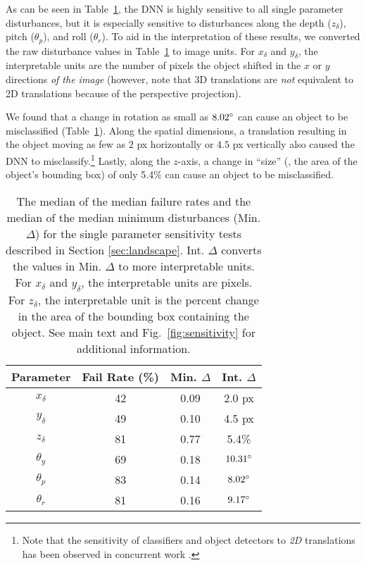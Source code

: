 \documentclass[10pt,twocolumn,letterpaper]{article}
\newcommand{\subsec}[1]{\noindent{\textbf{#1.}}}
\begin{document}
\subsec{Results}
As can be seen in Table~\ref{tab:fail_rates}, the DNN is highly sensitive to all single parameter disturbances, but it is especially sensitive to disturbances along the depth ($z_{\delta}$), pitch ($\theta_{p}$), and roll ($\theta_{r}$).
To aid in the interpretation of these results, we converted the raw disturbance values in Table~\ref{tab:fail_rates} to image units.
For $x_{\delta}$ and $y_{\delta}$, the interpretable units are the number of pixels the object shifted in the $x$ or $y$ directions \textit{of the image} (however, note that 3D translations are \textit{not} equivalent to 2D translations because of the perspective projection).

We found that a change in rotation as small as $8.02\degree$ can cause an object to be misclassified (Table~\ref{tab:fail_rates}).
Along the spatial dimensions, a translation resulting in the object moving as few as $2$ px horizontally or $4.5$ px vertically also caused the DNN to misclassify.\footnote{Note that the sensitivity of classifiers and object detectors to \textit{2D} translations has been observed in concurrent work \cite{rosenfeld2018elephant,anonymous2019a,zhang2019making,azulay2018deep}.}
Lastly, along the $z$-axis, a change in ``size'' (\ie, the area of the object's bounding box) of only 5.4\% can cause an object to be misclassified.

\begin{table}[h]
	\begin{center}
		\begin{tabular}{cccc}
			\toprule
			Parameter & Fail Rate (\%) & Min. $\Delta$ & Int. $\Delta$ \\
			\midrule
			$x_{\delta}$ & 42 & 0.09 & 2.0 px \\
			$y_{\delta}$ & 49 & 0.10 & 4.5 px \\
			$z_{\delta}$ & 81 & 0.77 & 5.4\% \\
			$\theta_{y}$ & 69 & 0.18 & $10.31\degree$ \\
			$\theta_{p}$ & 83 & 0.14 & $8.02\degree$ \\
			$\theta_{r}$ & 81 & 0.16 & $9.17\degree$ \\
			\bottomrule
		\end{tabular}
	\end{center}
	\caption{The median of the median failure rates and the median of the median minimum disturbances (Min. $\Delta$) for the single parameter sensitivity tests described in Section \ref{sec:landscape}.
	Int. $\Delta$ converts the values in Min. $\Delta$ to more interpretable units.
	For $x_{\delta}$ and $y_{\delta}$, the interpretable units are pixels.
	For $z_{\delta}$, the interpretable unit is the percent change in the area of the bounding box containing the object.
		See main text and Fig.~\ref{fig:sensitivity} for additional information.
	}
	\label{tab:fail_rates}
\end{table}
\end{document}
